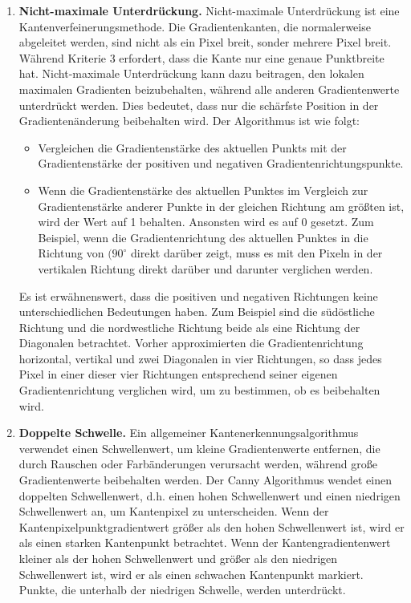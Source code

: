 \begin{enumerate}
	\item \textbf{Nicht-maximale Unterdrückung.} Nicht-maximale Unterdrückung ist eine Kantenverfeinerungsmethode. Die Gradientenkanten, die normalerweise abgeleitet werden, sind nicht als ein Pixel breit, sonder mehrere Pixel breit. Während Kriterie 3 erfordert, dass die Kante nur eine genaue Punktbreite hat. Nicht-maximale Unterdrückung kann dazu beitragen, den lokalen maximalen Gradienten beizubehalten, während alle anderen Gradientenwerte unterdrückt werden. Dies bedeutet, dass nur die schärfste Position in der Gradientenänderung beibehalten wird. Der Algorithmus ist wie folgt:
	\begin{itemize}
	\item Vergleichen die Gradientenstärke des aktuellen Punkts mit der Gradientenstärke der positiven und negativen Gradientenrichtungspunkte.
	\item Wenn die Gradientenstärke des aktuellen Punktes im Vergleich zur Gradientenstärke anderer Punkte in der gleichen Richtung am größten ist, wird der Wert auf 1 behalten. Ansonsten wird es auf 0 gesetzt. Zum Beispiel, wenn die Gradientenrichtung des aktuellen Punktes in die Richtung von $(90^{\circ}$ direkt darüber zeigt, muss es mit den Pixeln in der vertikalen Richtung direkt darüber und darunter verglichen werden.
	\end{itemize}
	
	Es ist erwähnenswert, dass die positiven und negativen Richtungen keine unterschiedlichen Bedeutungen haben. Zum Beispiel sind die südöstliche Richtung und die nordwestliche Richtung beide als eine Richtung der Diagonalen betrachtet. Vorher approximierten die Gradientenrichtung horizontal, vertikal und zwei Diagonalen in vier Richtungen, so dass jedes Pixel in einer dieser vier Richtungen entsprechend seiner eigenen Gradientenrichtung verglichen wird, um zu bestimmen, ob es beibehalten wird. 
	
	
	\item \textbf{Doppelte Schwelle.} Ein allgemeiner Kantenerkennungsalgorithmus verwendet einen Schwellenwert, um kleine Gradientenwerte entfernen, die durch Rauschen oder Farbänderungen verursacht werden, während große Gradientenwerte beibehalten werden.
Der Canny Algorithmus wendet einen doppelten Schwellenwert, d.h. einen hohen Schwellenwert und einen niedrigen Schwellenwert an, um Kantenpixel zu unterscheiden. Wenn der Kantenpixelpunktgradientwert größer als den hohen Schwellenwert ist, wird er als einen starken Kantenpunkt betrachtet.	Wenn der Kantengradientenwert kleiner als der hohen Schwellenwert und größer als den niedrigen Schwellenwert ist, wird er als einen schwachen Kantenpunkt markiert. Punkte, die unterhalb der niedrigen Schwelle, werden unterdrückt.


\end{enumerate}

